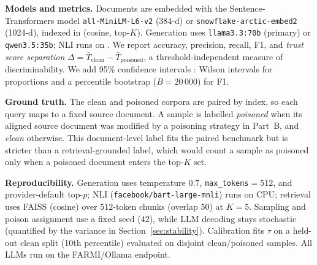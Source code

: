 \textbf{Models and metrics.} Documents are embedded with the Sentence-Transformers model \texttt{all-MiniLM-L6-v2} \cite{reimers2019sentence} (384-d) or \texttt{snowflake-arctic-embed2} (1024-d), indexed in  (cosine, top-$K$). Generation uses \texttt{llama3.3:70b} (primary) or \texttt{qwen3.5:35b}; NLI runs on . We report accuracy, precision, recall, F1, and \emph{trust score separation} $\Delta = \bar{T}_{\text{clean}} - \bar{T}_{\text{poisoned}}$, a threshold-independent measure of discriminability. We add 95\% confidence intervals : Wilson intervals for proportions and a percentile bootstrap ($B{=}20\,000$) for F1.

\textbf{Ground truth.} The clean and poisoned corpora are paired by index, so each query maps to a fixed source document. A sample is labelled \emph{poisoned} when its aligned source document was modified by a poisoning strategy in Part~B, and \emph{clean} otherwise. This document-level label fits the paired benchmark but is stricter than a retrieval-grounded label, which would count a sample as poisoned only when a poisoned document enters the top-$K$ set. 

\textbf{Reproducibility.} Generation uses temperature $0.7$, \texttt{max\_tokens}$=512$, and provider-default top-$p$; NLI (\texttt{facebook/bart-large-mnli}) runs on CPU; retrieval uses FAISS (cosine) over $512$-token chunks (overlap $50$) at $K{=}5$. Sampling and poison assignment use a fixed seed ($42$), while LLM decoding stays stochastic (quantified by the variance in Section~\ref{sec:stability}). Calibration fits $\tau$ on a held-out clean split (10th percentile) evaluated on disjoint clean/poisoned samples. All LLMs run on the FARMI/Ollama endpoint.
